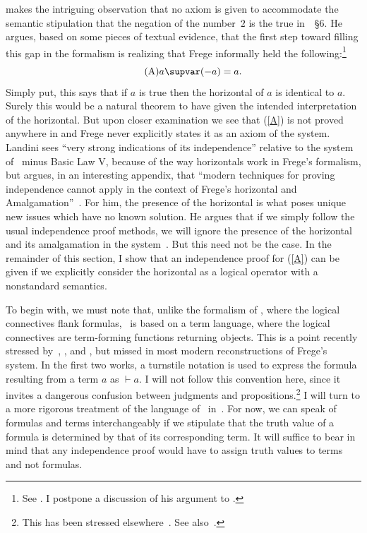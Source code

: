 \documentclass{preprint}
\renewcommand{\to}{\supvar}
\begin{document}
\cite{landini2022stipulations} makes the intriguing observation that no axiom is given to accommodate the semantic stipulation that the negation of the number~$2$ is the true in~\gga~\S6. 
He argues, based on some pieces of textual evidence, that the first step toward filling this gap in the formalism is realizing that Frege informally held the following:\footnote{
	See \citet[p.~352, \S4]{landini2022stipulations}. I postpone a discussion of his argument to .} 
\begin{equation}\tag{A} \label{A}
	a \to (-a)=a.
\end{equation}
Simply put, this says that if $a$ is true then the horizontal of $a$ is identical to $a$. 
Surely this would be a natural theorem to have given the intended interpretation of the horizontal. 
But upon closer examination we see that (\ref{A}) is not proved anywhere in {\gga} and Frege never explicitly states it as an axiom of the system. 
%
Landini sees ``very strong indications of its independence'' relative to the system of \gga~minus Basic Law V, 
because of the way horizontals work in Frege's formalism, but argues, in an interesting appendix, that ``modern techniques for proving independence cannot apply in the context of Frege's horizontal and Amalgamation''~\cite[p.~352, fn.~8]{landini2022stipulations}.  
For him, the presence of the horizontal is what poses unique new issues which have no known solution. He argues that if we simply follow the usual independence proof methods, we will ignore the presence of the horizontal and its amalgamation in the system~\cite[pp.~379--381]{landini2022stipulations}. 
But this need not be the case. In the remainder of this section, I show that an independence proof for (\ref{A}) can be given if we explicitly consider the horizontal as a logical operator with a nonstandard semantics. 


To begin with, we must note that, unlike the formalism of \bs, where the logical connectives flank formulas, \gga~is based on a term language, where the logical connectives are term-forming functions returning objects. 
This is a point recently stressed by~\cite{landini2012frege}, \cite{cadetpanza2015logical}, and \cite{bentzen2023fregett}, but missed in most modern reconstructions of Frege's system. 
In the first two works, a turnstile notation is used to express the formula resulting from a term $a$ as $\vdash a$. 
I will not follow this convention here, since it invites a dangerous confusion between judgments and propositions.\footnote{
	This has been stressed elsewhere~\citep[\S\S4.2--4.3]{bentzen2023fregett}. See also~\cite{kim2020horizontal}.} 
I will turn to a more rigorous treatment of the language of \gga~in~. 
For now, 
we can speak of formulas and terms interchangeably if we stipulate that the truth value of a formula is determined by that of its corresponding term. It will suffice to bear in mind that any independence proof would have to assign truth values to terms and not formulas. 
\end{document}
